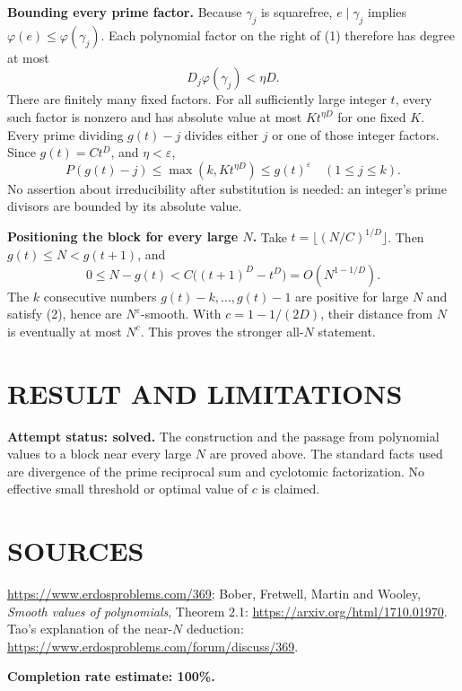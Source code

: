 \textbf{Bounding every prime factor.} Because $\gamma_j$ is squarefree, $e\mid\gamma_j$ implies $\varphi(e)\leq\varphi(\gamma_j)$. Each polynomial factor on the right of (1) therefore has degree at most
\[
D_j\varphi(\gamma_j)<\eta D.
\]
There are finitely many fixed factors. For all sufficiently large integer $t$, every such factor is nonzero and has absolute value at most $K t^{\eta D}$ for one fixed $K$. Every prime dividing $g(t)-j$ divides either $j$ or one of those integer factors. Since $g(t)=Ct^D$, and $\eta<\varepsilon$,
\[
P(g(t)-j)\leq\max(k,Kt^{\eta D})\leq g(t)^\varepsilon
\quad (1\leq j\leq k) .                                  \tag{2}
\]
No assertion about irreducibility after substitution is needed: an integer's prime divisors are bounded by its absolute value.

\textbf{Positioning the block for every large $N$.} Take
$t=\lfloor(N/C)^{1/D}\rfloor$. Then $g(t)\leq N<g(t+1)$, and
\[
0\leq N-g(t)<C\big((t+1)^D-t^D\big)=O(N^{1-1/D}).
\]
The $k$ consecutive numbers $g(t)-k,\ldots,g(t)-1$ are positive for large $N$ and satisfy (2), hence are $N^\varepsilon$-smooth. With $c=1-1/(2D)$, their distance from $N$ is eventually at most $N^c$. This proves the stronger all-$N$ statement.

\section{RESULT AND LIMITATIONS}
\textbf{Attempt status: solved.} The construction and the passage from polynomial values to a block near every large $N$ are proved above. The standard facts used are divergence of the prime reciprocal sum and cyclotomic factorization. No effective small threshold or optimal value of $c$ is claimed.

\section{SOURCES}
\url{https://www.erdosproblems.com/369}; Bober, Fretwell, Martin and Wooley, \emph{Smooth values of polynomials}, Theorem 2.1: \url{https://arxiv.org/html/1710.01970}. Tao's explanation of the near-$N$ deduction: \url{https://www.erdosproblems.com/forum/discuss/369}.

\textbf{Completion rate estimate: 100\%.}
